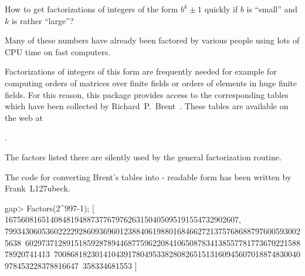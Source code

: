

How to get factorizations of integers of the form $b^k \pm 1$ quickly
if $b$ is ``small'' and $k$ is rather ``large''?

Many of these numbers have already been factored by various people
using lots of CPU time on fast computers.

Factorizations of integers of this form are frequently needed for
example for computing orders of matrices over finite fields or orders of
elements in huge finite fields. For this reason, this package provides
access to the corresponding tables which have been collected by
Richard~P.~Brent~\cite{Brent04}. These tables are available on the web at

.

The factors listed there are silently used by the general factorization
routine.

The code for converting Brent's tables into \GAP - readable form has been
written by Frank~L\accent127ubeck.

\beginexample
gap> Factors(2^997-1);
[ 167560816514084819488737767976263150405095191554732902607,
  7993430605360222292860936960123884061988016846627213757686887976005930025638\
602973712891518592878944687759622084106508783413855778177367022158878920741413\
700868182301410439178049533828082651513160945607018874830040978453228378816647\
358334681553 ]
\endexample


